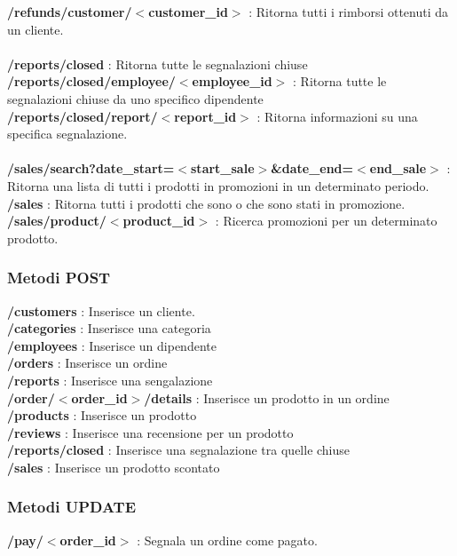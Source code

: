 \textbf{/refunds/customer/$<$customer\_id$>$ }: Ritorna tutti i rimborsi ottenuti da un cliente.\\\\
\textbf{/reports/closed} : Ritorna tutte le segnalazioni chiuse\\
\textbf{/reports/closed/employee/$<$employee\_id$>$} : Ritorna tutte le segnalazioni chiuse da uno specifico dipendente\\
\textbf{/reports/closed/report/$<$report\_id$>$ }: Ritorna informazioni su una specifica segnalazione.\\\\
\textbf{/sales/search?date\_start=$<$start\_sale$>$\&date\_end=$<$end\_sale$>$} : Ritorna una lista di tutti i prodotti in promozioni in un determinato periodo.\\
\textbf{/sales} : Ritorna tutti i prodotti che sono o che sono stati in promozione.\\
\textbf{/sales/product/$<$product\_id$>$} : Ricerca promozioni per un determinato prodotto.\\

\subsubsection{Metodi POST}
\textbf{/customers} : Inserisce un cliente.\\
\textbf{/categories} : Inserisce una categoria\\
\textbf{/employees} : Inserisce un dipendente\\
\textbf{/orders} : Inserisce un ordine\\
\textbf{/reports} : Inserisce una sengalazione\\
\textbf{/order/$<$order\_id$>$/details} : Inserisce un prodotto in un ordine\\
\textbf{/products} : Inserisce un prodotto\\
\textbf{/reviews} : Inserisce una recensione per un prodotto\\
\textbf{/reports/closed} : Inserisce una segnalazione tra quelle chiuse\\
\textbf{/sales} : Inserisce un prodotto scontato\\
\subsubsection{Metodi UPDATE}
\textbf{/pay/$<$order\_id$>$} : Segnala un ordine come pagato.\\

